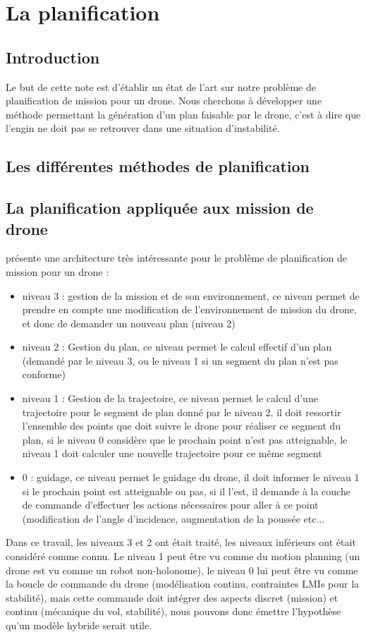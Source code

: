 \section{La planification}
\subsection*{Introduction}
Le but de cette note est d'établir un état de l'art sur notre problème de planification de mission pour un drone. Nous cherchons à développer une méthode permettant la génération d'un plan faisable par le drone, c'est à dire que l'engin ne doit pas se retrouver dans une situation d'instabilité.

\subsection{Les différentes méthodes de planification}

\subsection{La planification appliquée aux mission de drone}
\cite{CHA05} présente une architecture très intéressante pour le problème de planification de mission pour un drone : 
\begin{itemize}
	\item niveau 3 : gestion de la mission et de son environnement, ce niveau permet de prendre en compte une modification de l'environnement de mission du drone, et donc de demander un nouveau plan (niveau 2)
	\item niveau 2 : Gestion du plan, ce niveau permet le calcul effectif d'un plan (demandé par le niveau 3, ou le niveau 1 si un segment du plan n'est pas conforme)
	\item niveau 1 : Gestion de la trajectoire, ce niveau permet le calcul d'une trajectoire pour le segment de plan donné par le niveau 2, il doit ressortir l'ensemble des points que doit suivre le drone pour réaliser ce segment du plan, si le niveau 0 considère que le prochain point n'est pas atteignable, le niveau 1 doit calculer une nouvelle trajectoire pour ce même segment
	\item 0 : guidage, ce niveau permet le guidage du drone, il doit informer le niveau 1 si le prochain point est atteignable ou pas, si il l'est, il demande à la couche de commande d'effectuer les actions nécessaires pour aller à ce point (modification de l'angle d'incidence, augmentation de la poussée etc...
\end{itemize}
Dans ce travail, les niveaux 3 et 2 ont était traité, les niveaux inférieurs ont était considéré comme connu. Le niveau 1 peut être vu comme du motion planning (un drone est vu comme un robot non-holonome), le niveau 0 lui peut être vu comme la boucle de commande du drone (modélisation continu, contraintes LMIs pour la stabilité), mais cette commande doit intégrer des aspects discret (mission) et continu (mécanique du vol, stabilité), nous pouvons donc émettre l'hypothèse qu'un modèle hybride serait utile.

